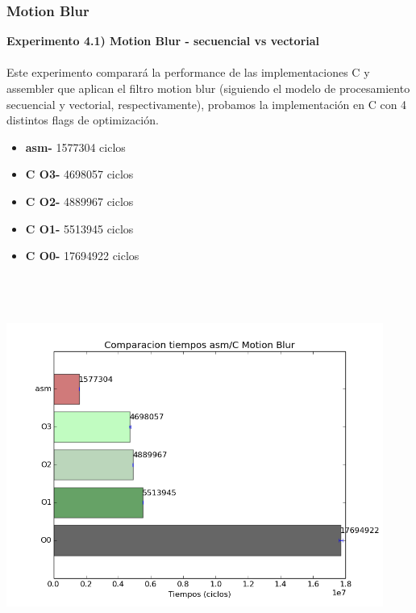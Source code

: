 \documentclass[a4paper]{article}
\begin{document}
\newpage

\subsubsection{Motion Blur}

\textbf{Experimento 4.1) Motion Blur - secuencial vs vectorial}\\ \\

Este experimento comparar\'{a} la performance de las implementaciones C y assembler que aplican el filtro motion blur (siguiendo el modelo de procesamiento secuencial y vectorial, respectivamente), probamos la implementaci\'{o}n en C con 4 distintos flags de optimizaci\'{o}n.

\begin{itemize}

\item \textbf{asm-}  1577304 ciclos
\item \textbf{C O3-} 4698057 ciclos\\
\item \textbf{C O2-} 4889967 ciclos\\
\item \textbf{C O1-} 5513945 ciclos\\
\item \textbf{C O0-} 17694922 ciclos\\\\ \\ \\

\end{itemize}

\includegraphics[width=350pt]{imagenes/CompCasm4.png}
\end{document}
